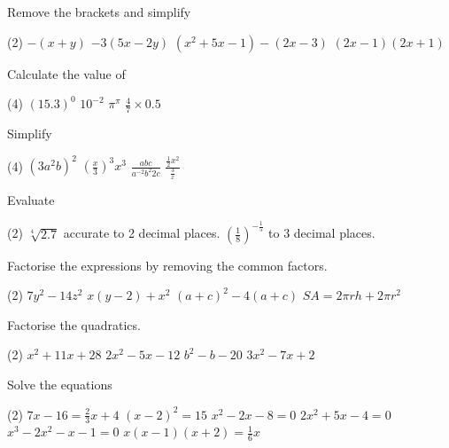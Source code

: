 \begin{Exercise}[title={Introductory Algebra},label=ex11]
 	\Question Remove the brackets and simplify
 	\begin{tasks}(2)
		\task 	 $ -\left (x +y\right )$ %
		\task    $ -3 (5 x -2 y)$	%
		\task 	$\left (x^{2} +5 x -1\right ) -\left (2 x -3\right )$%
		\task    $\left (2 x -1\right ) \left (2 x +1\right )$%
 	\end{tasks}

 	\Question Calculate the value of
 	\begin{tasks}(4)
 		\task 	 $\left (15.3\right )^{0}$
 		\task    $10^{ -2}$
 		\task	$\pi^\pi$%
 		\task	$\frac{4}{7}\times 0.5$%
 	\end{tasks}
 
 \Question Simplify
 \begin{tasks}(4)
 	\task 	 $\left (3 a^{2} b\right )^{2}$%
 	\task    $\left(\frac{x}{3}\right)^{3} x^{3}$%
 	\task	$\frac{abc}{a^{-2}b^2 2c}$%
 	\task	$\frac{\frac{1}{2}x^2}{\frac{3}{x}}$%
 \end{tasks}
 \Question Evaluate
 \begin{tasks}(2)
 	\task 	 $\sqrt[{4}]{2.7}$ accurate to 2 decimal places. %
 	\task    $ \left(\frac{1}{8}\right)^{-\frac{1}{5}}$ to 3 decimal places.%
 \end{tasks}
\Question Factorise the expressions by removing the common factors.
\begin{tasks}(2)
	\task 	$7y^2-14z^2$%
	\task  $x(y-2)+x^2$%
	\task $(a+c)^2-4(a+c)$%
	\task $SA=2\pi r h+2\pi r^2$%
\end{tasks}
\Question Factorise the quadratics.
\begin{tasks}(2)
	\task $x^{2} +11 x +28$%
	\task $2 x^{2} -5 x -12$%
	\task $b^2-b-20$%
	\task $3x^2-7x+2$%
\end{tasks}
\Question Solve the equations
\begin{tasks}(2)
	\task 	 $7 x -16 =\frac{2}{3} x +4$ %
	\task   $\left (x -2\right )^{2} =15$%
	\task 	$x^{2} -2 x -8 =0$%
	\task   $2 x^{2} +5 x -4 =0$%
	\task	$x^{3} -2 x^{2} -x -1 =0$%
	\task	$x \left (x -1\right ) \left (x +2\right ) =\frac{1}{6} x$%
\end{tasks}


 \end{Exercise}
